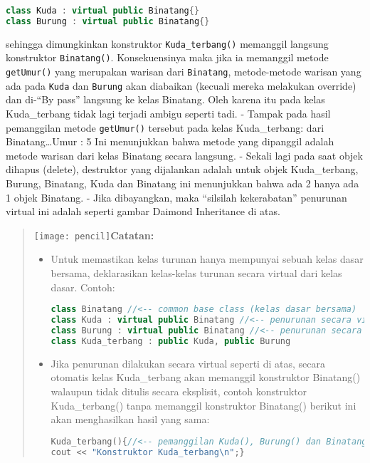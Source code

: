 \begin{lstlisting}[language=c++, numbers=none]
class Kuda : virtual public Binatang{}
class Burung : virtual public Binatang{}
\end{lstlisting}

sehingga dimungkinkan konstruktor \texttt{Kuda\_terbang()} memanggil
langsung konstruktor \texttt{Binatang()}. Konsekuensinya maka jika ia
memanggil metode \texttt{getUmur()} yang merupakan warisan dari
\texttt{Binatang}, metode-metode warisan yang ada pada \texttt{Kuda} dan
\texttt{Burung} akan diabaikan (kecuali mereka melakukan override) dan
di-``By pass'' langsung ke kelas Binatang. Oleh karena itu pada kelas
Kuda\_terbang tidak lagi terjadi ambigu seperti tadi. - Tampak pada
hasil pemanggilan metode \texttt{getUmur()} tersebut pada kelas
Kuda\_terbang: dari Binatang\ldots{}Umur : 5 Ini menunjukkan bahwa
metode yang dipanggil adalah metode warisan dari kelas Binatang secara
langsung. - Sekali lagi pada saat objek dihapus (delete), destruktor
yang dijalankan adalah untuk objek Kuda\_terbang, Burung, Binatang, Kuda
dan Binatang ini menunjukkan bahwa ada 2 hanya ada 1 objek Binatang. -
Jika dibayangkan, maka ``silsilah kekerabatan'' penurunan virtual ini
adalah seperti gambar Daimond Inheritance di atas.

\begin{quotation}
\texttt{[image: pencil]}\textbf{Catatan:}
	
\begin{itemize}
\item Untuk memastikan kelas turunan hanya mempunyai sebuah kelas dasar bersama,
deklarasikan kelas-kelas turunan secara virtual dari kelas dasar. Contoh:

\begin{lstlisting}[language=c++, numbers=none]
class Binatang //<-- common base class (kelas dasar bersama)
class Kuda : virtual public Binatang //<-- penurunan secara virtual
class Burung : virtual public Binatang //<-- penurunan secara virtual
class Kuda_terbang : public Kuda, public Burung
\end{lstlisting}

\item Jika penurunan dilakukan secara virtual seperti di atas, secara otomatis kelas
Kuda\_terbang akan memanggil konstruktor Binatang() walaupun tidak ditulis
secara eksplisit, contoh konstruktor Kuda\_terbang() tanpa memanggil konstruktor
Binatang() berikut ini akan menghasilkan hasil yang sama:
		
\begin{lstlisting}[language=c++, numbers=none]
Kuda_terbang(){//<-- pemanggilan Kuda(), Burung() dan Binatang() implisit
cout << "Konstruktor Kuda_terbang\n";}
\end{lstlisting}
\end{itemize}

\end{quotation}




